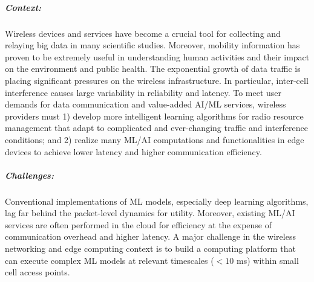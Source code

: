 \subparagraph*{Context:} Wireless devices and services have become a crucial tool for collecting and relaying big data in many scientific studies. Moreover, mobility information has proven to be extremely useful in understanding human activities and their impact on the environment and public health. The exponential growth of data traffic is placing significant pressures on the wireless infrastructure. In particular, inter-cell interference causes large variability in reliability and latency. To meet user demands for data communication and value-added AI/ML services, wireless providers must 1) develop more intelligent learning algorithms for radio resource management that adapt to complicated and ever-changing traffic and interference conditions; and 2) realize many ML/AI computations and functionalities in edge devices to achieve lower latency and higher communication efficiency.

\subparagraph*{Challenges:} Conventional implementations of ML models, especially deep learning algorithms, lag far behind the packet-level dynamics for utility.  Moreover, existing ML/AI services are often performed in the cloud for efficiency at the expense of communication overhead and higher latency.  A major challenge in the wireless networking and edge computing context is to build a computing platform that can execute complex ML models at relevant timescales ($< 10$ ms) within small cell access points.


